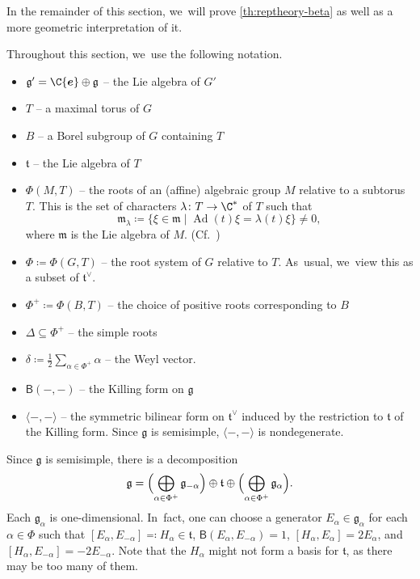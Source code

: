 \documentclass[JEP,XML,SOM,Unicode,published]{cedram}
\newcommand{\bme}{{\boldsymbol{e}}}
\begin{document}
In the remainder of this section, we~will prove \cref{th:reptheory-beta} as well as a more geometric interpretation of it.

\begin{notation}
Throughout this section, we~use the following notation.

\begin{itemize}
\item $\mathfrak{g}'=\C\bme\oplus \mathfrak{g}$ -- the Lie algebra of $G'$
\item $T$ -- a maximal torus of $G$
\item $B$ -- a Borel subgroup of $G$ containing $T$
\item $\mathfrak{t}$ -- the Lie algebra of $T$

\item $\Phi(M,T)$ -- the roots of an (affine) algebraic group $M$ relative to a subtorus $T$. This is the set of characters $\lambda\colon T\to \C^*$ of $T$ such that
\[
\mathfrak{m}_\lambda \coloneqq \{\xi\in \mathfrak{m} \mid \operatorname{Ad}(t)\xi = \lambda(t)\xi\}\neq 0,
\]
where $\mathfrak{m}$ is the Lie algebra of $M$. (Cf.~\cite{Hum75})

\item $\Phi\coloneqq \Phi(G,T)$ -- the root system of $G$ relative to $T$. As~usual, we~view this as a subset of $\mathfrak{t}^\vee$.

\item $\Phi^+\coloneqq \Phi(B,T)$ -- the choice of positive roots corresponding to $B$

\item $\Delta\subseteq \Phi^+$ -- the simple roots

\item $\delta \coloneqq \displaystyle\frac{1}{2}\sum_{\alpha\in \Phi^+}\alpha$ -- the Weyl vector.

\item $\mathsf{B}(-,-)$ -- the Killing form on $\mathfrak{g}$
\item $\langle-,-\rangle$ -- the symmetric bilinear form on $\mathfrak{t}^\vee$ induced by the restriction to $\mathfrak{t}$ of the Killing form. Since $\mathfrak{g}$ is semisimple, $\langle-,-\rangle$ is nondegenerate.
\qedhere
\end{itemize}
\end{notation}

Since $\mathfrak{g}$ is semisimple, there is a decomposition
\[
\mathfrak{g} = \Bigl(\bigoplus_{\alpha\in \Phi^+} \mathfrak{g}_{-\alpha}\Bigr)\oplus \mathfrak{t}\oplus \Bigl(\bigoplus_{\alpha\in \Phi^+} \mathfrak{g}_\alpha\Bigr).
\]
Each $\mathfrak{g}_\alpha$ is one-dimensional. In~fact, one can choose a generator $E_\alpha\in \mathfrak{g}_\alpha$ for each $\alpha\in \Phi$ such that $[E_\alpha,E_{-\alpha}]\eqqcolon H_\alpha\in \mathfrak{t}$, $\mathsf{B}(E_\alpha, E_{-\alpha})=1$, $[H_\alpha, E_\alpha]=2E_\alpha$, and $[H_\alpha, E_{-\alpha}]=-2E_{-\alpha}$. Note that the $H_\alpha$ might not form a basis for $\mathfrak{t}$, as there may be too many of them.
\end{document}
